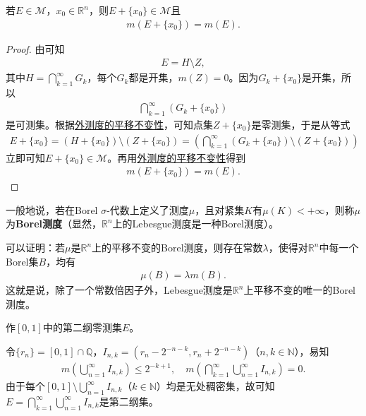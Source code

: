 \documentclass[../../main.tex]{subfiles}%
\begin{document}
\begin{theorem}
若\(E \in \mathscr{M}\)，\(x_0 \in \mathbb{R}^n\)，则\(E + \{x_0\} \in \mathscr{M}\)且
\begin{align*}
m(E + \{x_0\}) = m(E).
\end{align*}
\end{theorem}
\begin{proof}
由可知
\begin{align*}
E = H \setminus Z,
\end{align*}
其中\(H = \bigcap_{k = 1}^{\infty} G_k\)，每个\(G_k\)都是开集，\(m(Z) = 0\)。因为\(G_k + \{x_0\}\)是开集，所以
\begin{align*}
\bigcap_{k = 1}^{\infty} (G_k + \{x_0\})
\end{align*}
是可测集。根据\hyperref[theorem:外测度的平移不变性]{外测度的平移不变性}，可知点集\(Z + \{x_0\}\)是零测集，于是从等式
\begin{align*}
E + \{x_0\}= (H + \{x_0\}) \setminus (Z + \{x_0\})
= \left(\bigcap_{k = 1}^{\infty} (G_k + \{x_0\}) \setminus (Z + \{x_0\})\right)
\end{align*}
立即可知\(E + \{x_0\} \in \mathscr{M}\)。再用\hyperref[theorem:外测度的平移不变性]{外测度的平移不变性}得到
\begin{align*}
m(E + \{x_0\}) = m(E).
\end{align*}
\end{proof}
\begin{remark}
一般地说，若在Borel \(\sigma\)-代数上定义了测度\(\mu\)，且对紧集\(K\)有\(\mu(K)<+\infty\)，则称\(\mu\)为\textbf{Borel测度}（显然，\(\mathbb{R}^n\)上的Lebesgue测度是一种Borel测度）。

可以证明：若\(\mu\)是\(\mathbb{R}^n\)上的平移不变的Borel测度，则存在常数\(\lambda\)，使得对\(\mathbb{R}^n\)中每一个Borel集\(B\)，均有
\begin{align*}
\mu(B)=\lambda m(B).
\end{align*}
这就是说，除了一个常数倍因子外，Lebesgue测度是\(\mathbb{R}^n\)上平移不变的唯一的Borel测度。 
\end{remark}

\begin{example}
作\([0,1]\)中的第二纲零测集\(E\)。
\end{example}
\begin{solution}
令\(\{r_n\}=[0,1]\cap\mathbb{Q}\)，\(I_{n,k}=(r_n - 2^{-n - k},r_n + 2^{-n - k})\)（\(n,k\in\mathbb{N}\)），易知
\begin{align*}
m\left(\bigcup_{n = 1}^{\infty}I_{n,k}\right)\leqslant 2^{-k + 1},\quad
m\left(\bigcap_{k = 1}^{\infty}\bigcup_{n = 1}^{\infty}I_{n,k}\right)= 0.
\end{align*}
由于每个\([0,1]\setminus\bigcup_{n = 1}^{\infty}I_{n,k}\)（\(k\in\mathbb{N}\)）均是无处稠密集，故可知\(E = \bigcap_{k = 1}^{\infty}\bigcup_{n = 1}^{\infty}I_{n,k}\)是第二纲集。

\end{solution}
\end{document}
